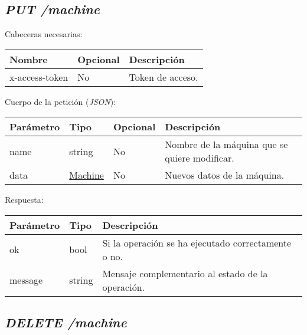 \pagebreak
\subsection{\textit{PUT /machine}}

Cabeceras necesarias:
\begin{table}[h!]
	\centering
	\begin{adjustbox}{max width=\textwidth}
	\begin{tabular}{|l|l|l|}
		\hline
		Nombre & Opcional & Descripción \\ \hline
		x-access-token & No & Token de acceso. \\ \hline
	\end{tabular}
\end{adjustbox}
\end{table}

Cuerpo de la petición (\textit{JSON}):
\begin{table}[h!]
	\centering
	\begin{adjustbox}{max width=\textwidth}
	\begin{tabularx}{\textwidth}{|l|l|l|L|}
		\hline
		Parámetro & Tipo & Opcional & Descripción \\ \hline
		name & string & No & Nombre de la máquina que se quiere modificar. \\ \hline
		data & \hyperref[sec:maquina]{Machine} & No & Nuevos datos de la máquina. \\ \hline
	\end{tabularx}
\end{adjustbox}
\end{table}


Respuesta:
\begin{table}[h!]
	\centering
	\begin{adjustbox}{max width=\textwidth}
	\begin{tabular}{|l|l|l|}
		\hline
		Parámetro & Tipo & Descripción \\ \hline
		ok & bool & Si la operación se ha ejecutado correctamente o no. \\ \hline
		message & string & Mensaje complementario al estado de la operación. \\ \hline
	\end{tabular}
\end{adjustbox}
\end{table}


\subsection{\textit{DELETE /machine}}


